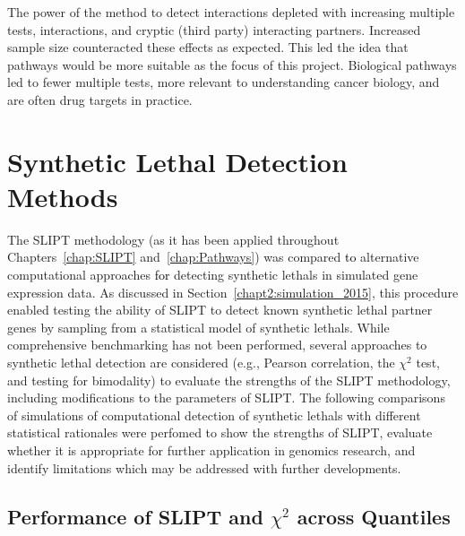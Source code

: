 The power of the method to detect interactions depleted with increasing multiple tests, interactions, and cryptic (third party) interacting partners. Increased sample size counteracted these effects as expected. This led the idea that pathways would be more suitable as the focus of this project. Biological pathways led to fewer multiple tests, more relevant to understanding cancer biology, and are often drug targets in practice.
\fi

\section{Synthetic Lethal Detection Methods} \label{chapt5:compare_methods}

The \gls{SLIPT} methodology (as it has been applied throughout Chapters~\ref{chap:SLIPT} and~\ref{chap:Pathways}) was compared \textcolor{black}{to} alternative computational approaches \textcolor{black}{for} detecting \glspl{synthetic lethal} in simulated \gls{gene expression} data. As discussed in Section~\ref{chapt2:simulation_2015}, this procedure enabled testing the ability of \gls{SLIPT} to detect known \gls{synthetic lethal} partner genes by sampling from a statistical model of \glspl{synthetic lethal}. While comprehensive benchmarking has not been performed, several approaches to \gls{synthetic lethal} detection are considered (e.g., Pearson correlation, the $\chi^2$ test, and testing for bimodality) to evaluate the strengths of the \gls{SLIPT} methodology, including modifications to the parameters of \gls{SLIPT}.
%
The following comparisons of simulations of computational detection of \glspl{synthetic lethal} with different statistical rationales were perfomed to show the strengths of \gls{SLIPT}, evaluate whether it is appropriate for further application in \glspl{genomic} research, and identify limitations which may be addressed with further developments. %

\subsection{Performance of SLIPT and $\chi^2$ across Quantiles}
\label{chapt5:compare_chisq}

